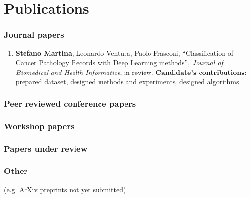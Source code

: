 \chapter{Publications}
\label{app:publications}

\subsection*{Journal papers}
\begin{enumerate}
\item \textbf{Stefano Martina}, Leonardo Ventura, Paolo Frasconi,
  ``Classification of Cancer Pathology Records with Deep Learning
  methods'', \textit{Journal of Biomedical and Health Informatics}, in
  review.
  \textbf{Candidate's contributions}: prepared dataset, designed
  methods and experiments, designed algorithms
\end{enumerate}
\subsection*{Peer reviewed conference papers}
\subsection*{Workshop papers}
\subsection*{Papers under review}
\subsection*{Other}
(e.g. ArXiv preprints not yet submitted)


